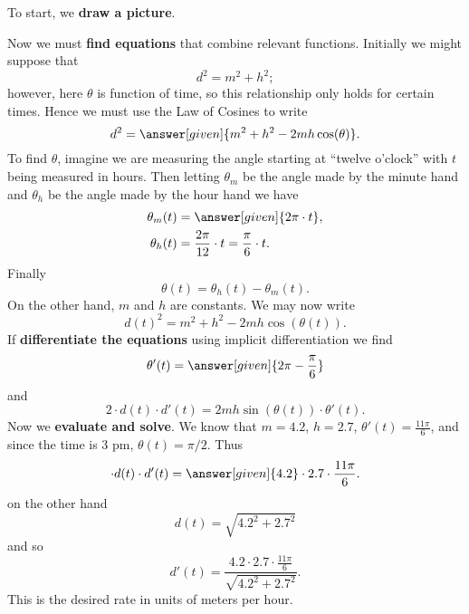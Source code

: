 \documentclass{ximera}
\begin{document}
\begin{example}
  \begin{explanation}
    To start, we \textbf{draw a picture}.
    \begin{image}
    \end{image}
    Now we must \textbf{find equations} that combine relevant
    functions. Initially we might suppose that
    \[
    d^2 = m^2 + h^2;
    \]
    however, here $\theta$ is function of time, so this relationship
    only holds for certain times. Hence we must use the Law of Cosines
    to write
    \[
    d^2 = \answer[given]{m^2 + h^2 - 2mh\cos(\theta)}.
    \]
    To find $\theta$, imagine we are measuring the angle starting at
    ``twelve o'clock'' with $t$ being measured in hours. Then letting
    $\theta_m$ be the angle made by the minute hand and $\theta_h$ be
    the angle made by the hour hand we have
    \begin{align*}
      \theta_m(t) &= \answer[given]{2\pi \cdot t},\\
      \theta_h(t) &= \frac{2\pi}{12}\cdot t =\frac{\pi}{6}\cdot t.
    \end{align*}
    Finally
    \[
    \theta(t) = \theta_h(t) - \theta_m(t).
    \]
    On the other hand, $m$ and $h$ are constants. We may now write
    \[
    d(t)^2 = m^2 + h^2 - 2mh\cos(\theta(t)).
    \]
    If \textbf{differentiate the equations} using implicit
    differentiation we find
    \[
    \theta'(t) = \answer[given]{2\pi - \frac{\pi}{6}}
    \]
    and
    \[
    2\cdot d(t) \cdot d'(t)  = 2mh\sin(\theta(t))\cdot \theta'(t).
    \]
    Now we \textbf{evaluate and solve}.  We know that $m=4.2$,
    $h=2.7$, $\theta'(t) = \frac{11\pi}{6}$, and since the time is $3$
    pm, $\theta(t) = \pi/2$. Thus
    \[
    \cdot d(t) \cdot d'(t)  = \answer[given]{4.2}\cdot 2.7\cdot \frac{11\pi}{6}.
    \]
    on the other hand
    \[
    d(t) = \sqrt{4.2^2 + 2.7^2}
    \]
    and so
    \[
    d'(t) = \frac{4.2\cdot 2.7\cdot \frac{11\pi}{6}}{\sqrt{4.2^2 + 2.7^2}}.
    \]
    This is the desired rate in units of meters per hour.
  \end{explanation}
\end{example}
\end{document}
